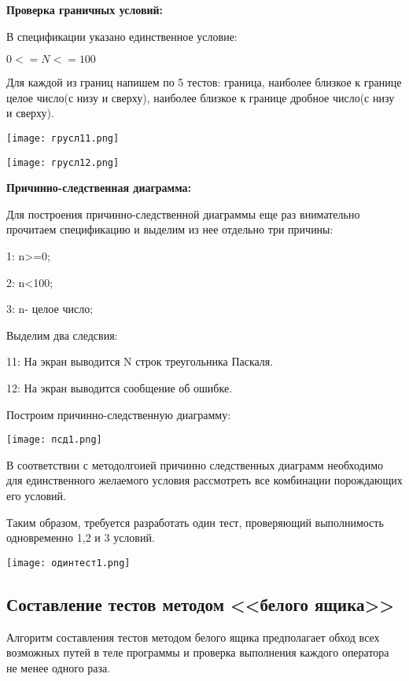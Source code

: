 \documentclass[12pt]{article}
\begin{document}
{\bf Проверка граничных условий:}

В спецификации указано единственное условие:

$0<=N<=100$

Для каждой из границ напишем по 5 тестов: граница, наиболее близкое к границе целое число(с низу и сверху), наиболее близкое к границе дробное число(с низу и сверху).


\vskip 1cm
{
    \centering
    \texttt{[image: грусл11.png]}
   
    \label{fig:i1}
}
{
    \centering
    \texttt{[image: грусл12.png]}
   
    \label{fig:i1}
}
\vskip 1cm


{\bf Причинно-следственная диаграмма:}

Для построения причинно-следственной диаграммы еще раз внимательно прочитаем спецификацию и выделим из нее отдельно три причины:

1:   n>=0;

2:   n<100;

3:   n- целое число;


Выделим два следсвия:

11: На экран выводится N строк треугольника Паскаля.

12: На экран выводится сообщение об ошибке.

Построим причинно-следственную диаграмму:

\vskip 1cm
{
    \centering
    \texttt{[image: псд1.png]}
   
    \label{fig:i1}
}
\vskip 1cm

В соответствии с методолгоией причинно следственных диаграмм необходимо для единственного желаемого условия рассмотреть все комбинации порождающих его условий.

Таким образом, требуется разработать один тест, проверяющий выполнимость одновременно 1,2 и 3 условий.

\vskip 1cm
{
    \centering
    \texttt{[image: одинтест1.png]}
   
    \label{fig:i1}
}
\vskip 1cm


\subsection{Составление тестов методом <<белого ящика>>}
Алгоритм составления тестов методом белого ящика предполагает обход всех возможных путей в теле программы и проверка выполнения каждого оператора не менее одного раза.
\end{document}
